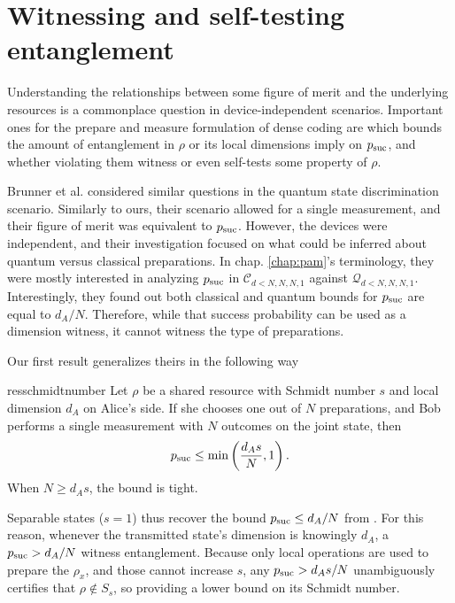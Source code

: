     \section{Witnessing and self-testing entanglement}

        Understanding the relationships between some figure of merit and the underlying resources is a commonplace question in device-independent scenarios. Important ones for the prepare and measure formulation of dense coding are which bounds the amount of entanglement in $\rho$ or its local dimensions imply on $p_{\text{suc}}$, and whether violating them witness or even self-tests some property of $\rho$. 
    
        Brunner et al. \cite{brunner_dimension_2013} considered similar questions in the quantum state discrimination scenario. Similarly to ours, their scenario allowed for a single measurement, and their figure of merit was equivalent to $p_{\text{suc}}$. However, the devices were independent, and their investigation focused on what could be inferred about quantum versus classical preparations. In chap. \ref{chap:pam}'s terminology, they were mostly interested in analyzing $p_{\text{suc}}$ in $\mathcal{C}_{d<N,N,N,1}$ against $\mathcal{Q}_{d<N,N,N,1}$. Interestingly, they found out both classical and quantum bounds for $p_{\text{suc}}$ are equal to $d_A / N$. Therefore, while that success probability can be used as a dimension witness, it cannot witness the type of preparations.
        
        Our first result generalizes theirs in the following way
        \begin{restatable}{res}{schmidtnumber}
            Let $\rho$ be a shared resource with Schmidt number $s$ and local dimension $d_A$ on Alice's side. If she chooses one out of $N$ preparations, and Bob performs a single measurement with $N$ outcomes on the joint state, then
            \begin{equation}
                p_{\text{suc}} \leq \min \left( \frac{d_A s}{N}, 1 \right) .
                \label{eq:result-1}
            \end{equation}
            When $N \geq d_A s$, the bound is tight.
            \label{res:1}
            \label{res:schmidt-number-witness}
        \end{restatable}
        Separable states ($s=1$) thus recover the bound $p_{\text{suc}} \leq d_A / N$ from \cite{brunner_dimension_2013}. For this reason, whenever the transmitted state's dimension is knowingly $d_A$, a $p_{\text{suc}} > d_A / N$ witness entanglement. Because only local operations are used to prepare the $\rho_x$, and those cannot increase $s$, any $p_{\text{suc}} > d_A s / N$ unambiguously certifies that $\rho \notin S_s$, so providing a lower bound on its Schmidt number.
        
